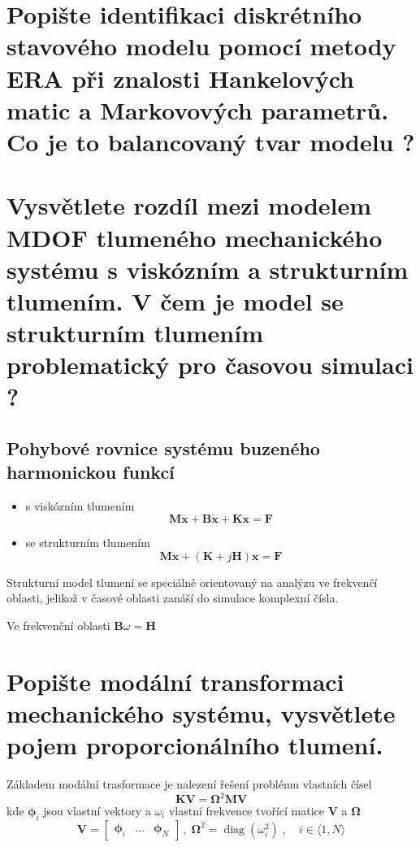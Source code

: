\documentclass{article}
\begin{document}
	\section{Popište identifikaci diskrétního stavového modelu pomocí metody ERA při znalosti Hankelových matic a Markovových parametrů. Co je to balancovaný tvar modelu ? }



	\section{Vysvětlete rozdíl mezi modelem MDOF tlumeného mechanického systému s viskózním a strukturním tlumením. V čem je model se strukturním tlumením problematický pro časovou simulaci ? }

	\subsection{Pohybové rovnice systému buzeného harmonickou funkcí}
	\begin{itemize}
		\item s viskózním tlumením
		\begin{equation}
			\bm{M}\bm{\ddot{x}} + \bm{B}\bm{\dot{x}} + \bm{K}\bm{x} = \bm{F}
		\end{equation}
		\item se strukturním tlumením
		\begin{equation}
			\bm{M}\bm{\ddot{x}} + (\bm{K} + j\bm{H}) \bm{x} = \bm{F}
		\end{equation}
	\end{itemize}

	Strukturní model tlumení se speciálně orientovaný na analýzu ve frekvenčí oblasti, jelikož v časové oblasti zanáší do simulace komplexní čísla.

	Ve frekvenční oblasti $\bm{B}\omega = \bm{H}$

	\section{Popište modální transformaci mechanického systému, vysvětlete pojem proporcionálního tlumení. }

	Základem modální trasformace je nalezení řešení problému vlastních čísel
	\begin{equation*}
		\bm{K}\bm{V} = \bm{\Omega}^2 \bm{M} \bm{V}
	\end{equation*}
	kde $\bm{\phi}_i$ jsou vlastní vektory a $\omega_i$ vlastní frekvence tvořící matice $\bm{V}$ a $\bm{\Omega}$  
	\begin{equation*}
		\bm{V} = \begin{bmatrix} \bm{\phi}_i & \dots & \bm{\phi}_N \end{bmatrix}
		\,,\;
		\bm{\Omega}^2 = \operatorname{diag}(\omega_i^2)
		\;,\quad 
		i \in \langle 1,N \rangle
	\end{equation*}
\end{document}
